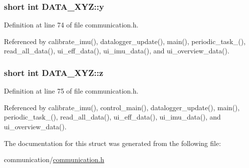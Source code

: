 \hypertarget{structDATA__XYZ_a94bbb1c889bf53eb6a5fffa2b39322cf}{
\subsubsection[{y}]{\setlength{\rightskip}{0pt plus 5cm}short int D\-A\-T\-A\-\_\-\-X\-Y\-Z\-::y}}\label{structDATA__XYZ_a94bbb1c889bf53eb6a5fffa2b39322cf}


Definition at line 74 of file communication.\-h.



Referenced by calibrate\-\_\-imu(), datalogger\-\_\-update(), main(), periodic\-\_\-task\-\_(), read\-\_\-all\-\_\-data(), ui\-\_\-eff\-\_\-data(), ui\-\_\-imu\-\_\-data(), and ui\-\_\-overview\-\_\-data().

\hypertarget{structDATA__XYZ_a69e89ab0ec6e5d72fc5d54f62cc07fb5}{
\subsubsection[{z}]{\setlength{\rightskip}{0pt plus 5cm}short int D\-A\-T\-A\-\_\-\-X\-Y\-Z\-::z}}\label{structDATA__XYZ_a69e89ab0ec6e5d72fc5d54f62cc07fb5}


Definition at line 75 of file communication.\-h.



Referenced by calibrate\-\_\-imu(), control\-\_\-main(), datalogger\-\_\-update(), main(), periodic\-\_\-task\-\_(), read\-\_\-all\-\_\-data(), ui\-\_\-eff\-\_\-data(), ui\-\_\-imu\-\_\-data(), and ui\-\_\-overview\-\_\-data().



The documentation for this struct was generated from the following file\-:\begin{DoxyCompactItemize}
\item 
communication/\hyperlink{communication_2communication_8h}{communication.\-h}\end{DoxyCompactItemize}
